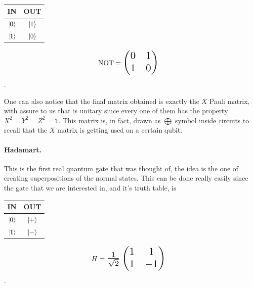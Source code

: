 \begin{minipage}{0.45\textwidth}
    \centering
    \begin{tabular}{c|c}
        \textbf{IN} & \textbf{OUT}\\
        \midrule
        $\ket{0}$ & $\ket{1}$\\
        $\ket{1}$ & $\ket{0}$
    \end{tabular}
\end{minipage}
\begin{minipage}{0.45\textwidth}
    \centering
    \begin{equation}
        \text{NOT} = \scalebox{1.5}{$\begin{pmatrix}
            0 & 1\\
            1 & 0
        \end{pmatrix}$}
    \end{equation}.
\end{minipage}

\noindent
One can also notice that the final matrix obtained is exactly the $X$ Pauli matrix, with assure to us that is unitary since every one of them has the property $X^2 = Y^2 = Z^2 = \mathbb{1}$. This matrix is, in fact, drawn as $\bigoplus$ symbol inside circuits to recall that the $X$ matrix is getting used on a certain qubit.

\paragraph{Hadamart.} This is the first real quantum gate that was thought of, the idea is the one of creating superpositions of the normal states. This can be done really easily since the gate that we are interested in, and it's truth table, is

\begin{minipage}{0.45\textwidth}
    \centering
    \begin{tabular}{c|c}
        \textbf{IN} & \textbf{OUT}\\
        \midrule
        $\ket{0}$ & $\ket{+}$\\
        $\ket{1}$ & $\ket{-}$
    \end{tabular}
\end{minipage}
\begin{minipage}{0.45\textwidth}
    \centering
    \begin{equation}
        H = \scalebox{1.5}{$\frac{1}{\sqrt{2}}\begin{pmatrix}
            1 & 1\\
            1 & -1
        \end{pmatrix}$}
    \end{equation}.
\end{minipage}


